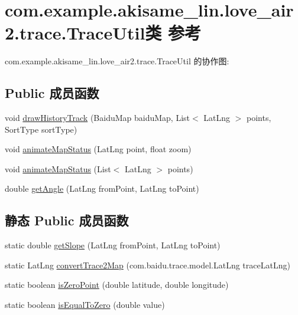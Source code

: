 \hypertarget{classcom_1_1example_1_1akisame__lin_1_1love__air2_1_1trace_1_1_trace_util}{}\section{com.\+example.\+akisame\+\_\+lin.\+love\+\_\+air2.\+trace.\+Trace\+Util类 参考}
\label{classcom_1_1example_1_1akisame__lin_1_1love__air2_1_1trace_1_1_trace_util}


com.\+example.\+akisame\+\_\+lin.\+love\+\_\+air2.\+trace.\+Trace\+Util 的协作图\+:
\subsection*{Public 成员函数}
\begin{DoxyCompactItemize}
\item 
void \mbox{\hyperlink{classcom_1_1example_1_1akisame__lin_1_1love__air2_1_1trace_1_1_trace_util_acb3327c4001f4adf9021efd0ab08e1c2}{draw\+History\+Track}} (Baidu\+Map baidu\+Map, List$<$ Lat\+Lng $>$ points, Sort\+Type sort\+Type)
\item 
void \mbox{\hyperlink{classcom_1_1example_1_1akisame__lin_1_1love__air2_1_1trace_1_1_trace_util_a92503eee73e5103a40d0a1ad80159f68}{animate\+Map\+Status}} (Lat\+Lng point, float zoom)
\item 
void \mbox{\hyperlink{classcom_1_1example_1_1akisame__lin_1_1love__air2_1_1trace_1_1_trace_util_a22ad9d640bc36402ecf0156cf64685f5}{animate\+Map\+Status}} (List$<$ Lat\+Lng $>$ points)
\item 
double \mbox{\hyperlink{classcom_1_1example_1_1akisame__lin_1_1love__air2_1_1trace_1_1_trace_util_a06ff7ea1a310188cdb9fffe8d2b58ce3}{get\+Angle}} (Lat\+Lng from\+Point, Lat\+Lng to\+Point)
\end{DoxyCompactItemize}
\subsection*{静态 Public 成员函数}
\begin{DoxyCompactItemize}
\item 
static double \mbox{\hyperlink{classcom_1_1example_1_1akisame__lin_1_1love__air2_1_1trace_1_1_trace_util_a3d1f6f674d4e5aa7905065435bdbeba7}{get\+Slope}} (Lat\+Lng from\+Point, Lat\+Lng to\+Point)
\item 
static Lat\+Lng \mbox{\hyperlink{classcom_1_1example_1_1akisame__lin_1_1love__air2_1_1trace_1_1_trace_util_a18fd0500677f5a558dd94bdcbf7a28c2}{convert\+Trace2\+Map}} (com.\+baidu.\+trace.\+model.\+Lat\+Lng trace\+Lat\+Lng)
\item 
static boolean \mbox{\hyperlink{classcom_1_1example_1_1akisame__lin_1_1love__air2_1_1trace_1_1_trace_util_ac1e5fe83df677f46df6bfb67959c9f7d}{is\+Zero\+Point}} (double latitude, double longitude)
\item 
static boolean \mbox{\hyperlink{classcom_1_1example_1_1akisame__lin_1_1love__air2_1_1trace_1_1_trace_util_a38c1e50c145bbffaea2436d26a8aa5d1}{is\+Equal\+To\+Zero}} (double value)
\end{DoxyCompactItemize}
